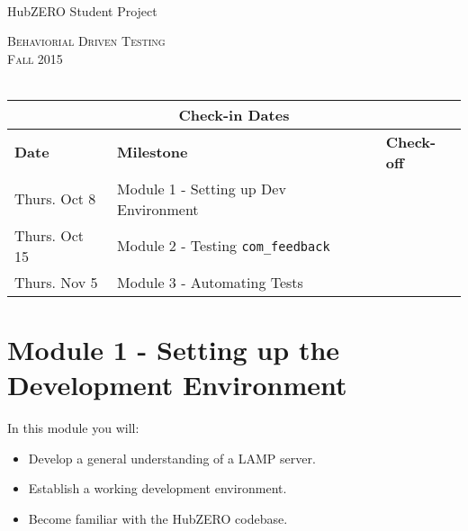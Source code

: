 \documentclass[10pt,letterpaper,titlepage]{article}
\begin{document}
\setmainfont{Times New Roman}

\begin{titlepage}
\begin{center}

~\\[4.25cm]

{ \huge HubZERO Student Project \\[0.25cm] }

\textsc{\large Behaviorial Driven Testing}\\[0.25cm]
\textsc{\large Fall 2015}\\[0.5cm]

~ \\[1.5cm]
\begin{tabular}{ |l|l|l| }
\hline
\multicolumn{3}{|c|}{Check-in Dates} \\
\hline
\textbf{Date} & \textbf{Milestone} & \textbf{Check-off} \\
\hline
Thurs. Oct 8 & Module 1 - Setting up Dev Environment & \\
\hline
Thurs. Oct 15 & Module 2 - Testing \texttt{com\_feedback} &   \\ 
\hline
Thurs. Nov 5 & Module 3 - Automating Tests& \\ 
\hline
\end{tabular}
\vfill
\end{center}
\end{titlepage}


\newpage
\thispagestyle{empty}
\tableofcontents
\thispagestyle{empty}
\newpage

			
\newpage
\section{Module 1 - Setting up the Development Environment}
In this module you will: 
\begin{itemize}
\item Develop a general understanding of a LAMP server.
\item Establish a working development environment.
\item Become familiar with the HubZERO codebase. 
\end{itemize}
\end{document}
